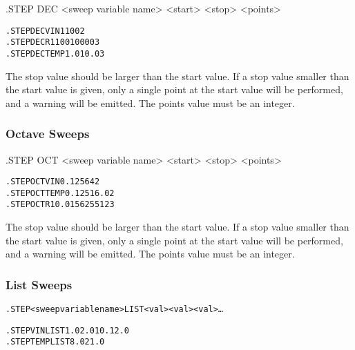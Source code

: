\begin{Command}

\format
.STEP DEC <sweep variable name> <start> <stop> <points>

\examples

\begin{alltt}
.STEP DEC VIN 1 100 2
.STEP DEC R1 100 10000 3 
.STEP DEC TEMP 1.0 10.0 3
\end{alltt}

\comments
The stop value should be larger than the start value.  If a stop value
smaller than the start value is given, only a single point at the
start value will be performed, and a warning will be emitted.  The
points value must be an integer.

\end{Command}

\subsubsection{Octave Sweeps}
 

\begin{Command}

\format
.STEP OCT <sweep variable name> <start> <stop> <points>

\examples

\begin{alltt}
.STEP OCT VIN 0.125 64 2 
.STEP OCT TEMP 0.125 16.0 2 
.STEP OCT R1 0.015625 512 3
\end{alltt}

\comments
The stop value should be larger than the start value.  If a stop value
smaller than the start value is given, only a single point at the
start value will be performed, and a warning will be emitted.  The
points value must be an integer.

\end{Command}

\subsubsection{List Sweeps}
 

\begin{Command}

\format
\begin{alltt}
.STEP <sweep variable name> LIST <val> <val> <val>\ldots
\end{alltt}

\examples
\begin{alltt}
.STEP VIN LIST 1.0 2.0 10. 12.0 
.STEP TEMP LIST 8.0 21.0
\end{alltt}

\end{Command}


